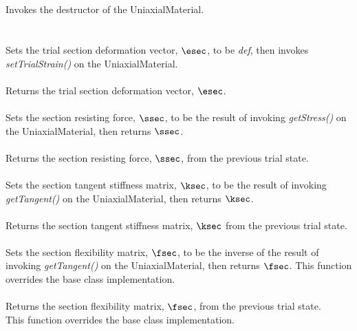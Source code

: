  \\
\\ 
Invokes the destructor of the UniaxialMaterial. \\

 \\
  \\
Sets the trial section deformation vector, $\esec$, to be {\em def}, then invokes
{\em setTrialStrain()} on the UniaxialMaterial. \\

 \\
Returns the trial section deformation vector, $\esec$. \\

 \\
Sets the section resisting force, $\ssec$, to be the result of invoking 
{\em getStress()} on the UniaxialMaterial, then returns $\ssec$. \\

 \\
Returns the section resisting force, $\ssec$, from the previous trial state. \\

 \\
Sets the section tangent stiffness matrix, $\ksec$, to be the result of
invoking {\em getTangent()} on the UniaxialMaterial, then returns $\ksec$. \\

 \\
Returns the section tangent stiffness matrix, $\ksec$ from the previous trial state. \\

 \\
Sets the section flexibility matrix, $\fsec$, to be the inverse of the result
of invoking {\em getTangent()} on the UniaxialMaterial, then returns $\fsec$.
This function overrides the base class implementation. \\

 \\
Returns the section flexibility matrix, $\fsec$, from the previous trial state. \\
This function overrides the base class implementation. \\

